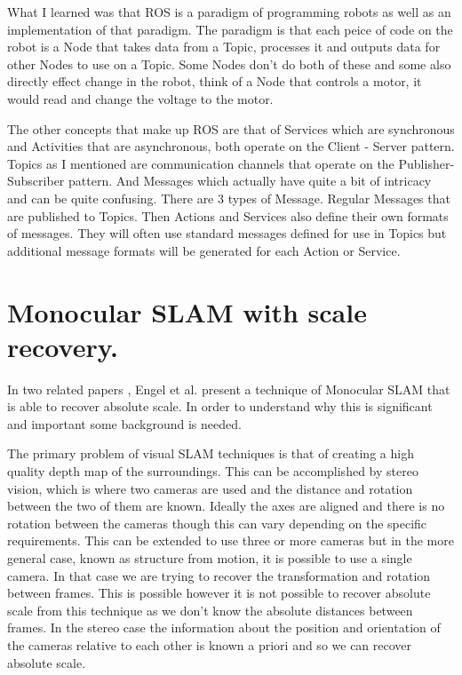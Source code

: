 \documentclass[]{../resources/final_report}
\begin{document}
What I learned was that ROS is a paradigm of programming robots as well as an 
implementation of that paradigm. The paradigm is that each peice of code on the robot is a Node 
that takes data from a Topic, processes it and outputs data for other Nodes to use on a Topic. 
Some Nodes don't do both of these and some also directly effect change in the robot, think of a 
Node that controls a motor, it would read and change the voltage to the motor.

The other concepts that make up ROS are that of Services which are synchronous and Activities that 
are asynchronous, both operate on the Client - Server pattern. Topics as I mentioned are 
communication channels that operate on the Publisher-Subscriber pattern. And Messages which actually 
have quite a bit of intricacy and can be quite confusing. There are 3 types of Message. Regular 
Messages that are published to Topics. Then Actions and Services also define their own formats of 
messages. They will often use standard messages defined for use in Topics but additional message 
formats will be generated for each Action or Service.

\section{Monocular SLAM with scale recovery.}

In two related papers \cite{Engel:FigureFlying}\cite{Engel:Camera-basedNav}, Engel et al. present a 
technique of Monocular SLAM that is able to recover absolute scale. In order to understand why 
this is significant and important some background is needed.

The primary problem of visual SLAM techniques is that of creating a high quality depth map of the 
surroundings. This can be accomplished by stereo vision, which is where two cameras are used and the 
distance and rotation between the two of them are known. Ideally the axes are aligned and there is 
no rotation between the cameras though this can vary depending on the specific requirements.
This can be extended to use three or more cameras but in the more general case, known as structure 
from motion, it is possible to use a single camera. In that case we are trying to recover the 
transformation and rotation between frames. This is possible however it is not possible to recover 
absolute scale from this technique as we don't know the absolute distances between frames. In the 
stereo case the information about the position and orientation of the cameras relative to each other
is known a priori and so we can recover absolute scale.
\end{document}
